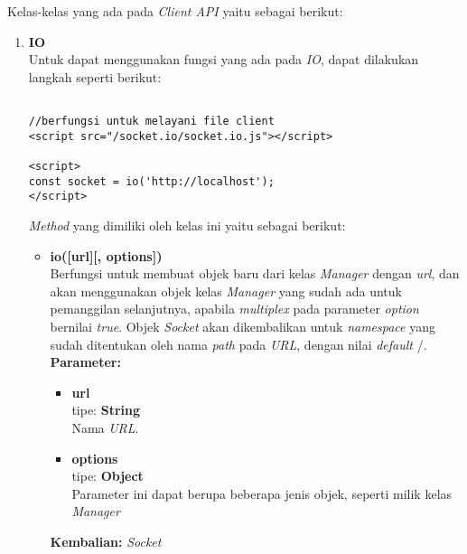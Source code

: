 Kelas-kelas yang ada pada \textit{Client API} yaitu sebagai berikut:
\begin{enumerate}
	\item \textbf{IO} \\
	Untuk dapat menggunakan fungsi yang ada pada \textit{IO}, dapat dilakukan langkah seperti berikut:
\begin{lstlisting}
	
//berfungsi untuk melayani file client
<script src="/socket.io/socket.io.js"></script>
	
<script>
const socket = io('http://localhost');
</script>
\end{lstlisting}

	
	\textit{Method} yang dimiliki oleh kelas ini yaitu sebagai berikut:
	\begin{itemize}
		\item \textbf{io([url][, options])} \\
		Berfungsi untuk membuat objek baru dari kelas \textit{Manager} dengan \textit{url}, dan akan menggunakan objek kelas \textit{Manager} yang sudah ada untuk pemanggilan selanjutnya, apabila \textit{multiplex} pada parameter \textit{option} bernilai \textit{true}. Objek \textit{Socket} akan dikembalikan untuk \textit{namespace} yang sudah ditentukan oleh nama \textit{path} pada \textit{URL}, dengan nilai \textit{default} /. \\
		\textbf{Parameter:}
		\begin{itemize}
			\item \textbf{url} \\tipe: \textbf{String} \\ Nama \textit{URL}.
			\item \textbf{options} \\tipe: \textbf{Object} \\ Parameter ini dapat berupa beberapa jenis objek, seperti milik kelas \textit{Manager}
		\end{itemize}
		\textbf{Kembalian:} \textit{Socket}
		
	\end{itemize}
	

\end{enumerate}
